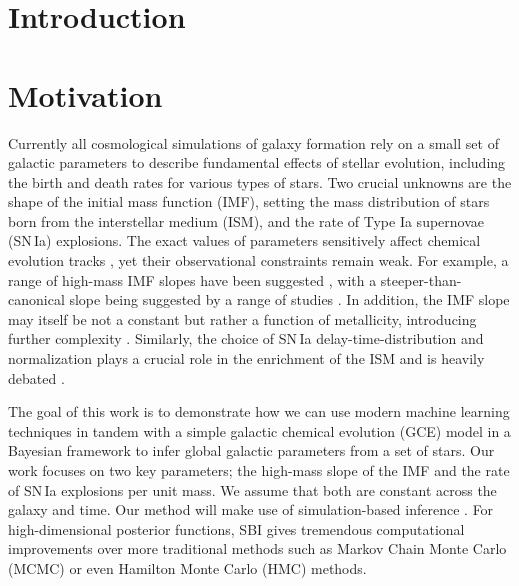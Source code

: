 \documentclass{aa}
\begin{document}
\section{Introduction}

\section{Motivation}

Currently all cosmological simulations of galaxy formation \citep[e.g.][]{Sawala2016,Hopkins2018,Pillepich2018,Buck2020,Buck2020c,Font2020,Agertz2021} rely on a small set of galactic parameters to describe fundamental effects of stellar evolution, including the birth and death rates for various types of stars. Two crucial unknowns are the shape of the initial mass function (IMF), setting the mass distribution of stars born from the interstellar medium (ISM), and the rate of Type Ia supernovae (SN\,Ia) explosions.
%
The exact values of parameters sensitively affect chemical evolution tracks \citep{2005A&A...430..491R,2015MNRAS.449.1327V,2015MNRAS.451.3693M}, yet their observational constraints remain weak.
%
For example, a range of high-mass IMF slopes have been suggested \citep[Tab.\,7]{2016ApJ...824...82C}, with a steeper-than-canonical slope being suggested by a range of studies \citep[e.g.][]{2015ApJ...806..198W,2015MNRAS.447.3880R,2014ApJ...796...75C}. In addition, the IMF slope may itself be not a constant but rather a function of metallicity, introducing further complexity \citep[e.g.][]{2019MNRAS.482..118G,2019A&A...626A.124M}. Similarly, the choice of SN\,Ia delay-time-distribution and normalization plays a crucial role in the enrichment of the ISM \citep[e.g.][]{Buck2021} and is heavily debated \citep{2010ApJ...722.1879M,2012MNRAS.426.3282M,2015ApJ...810..137J}. 

The goal of this work is to demonstrate how we can use modern machine learning techniques in tandem with a simple galactic chemical evolution (GCE) model in a Bayesian framework to infer global galactic parameters from a set of stars. Our work focuses on two key parameters; the high-mass slope of the \citet[Tab.\,1]{2003PASP..115..763C} IMF and the rate of SN\,Ia explosions per unit mass. We assume that both are constant across the galaxy and time. 
%
Our method will make use of simulation-based inference \citep[SBI, e.g.][]{Cranmer2020}. For high-dimensional posterior functions, SBI gives tremendous computational improvements over more traditional methods such as Markov Chain Monte Carlo (MCMC) or even Hamilton Monte Carlo (HMC) methods. 
\end{document}
